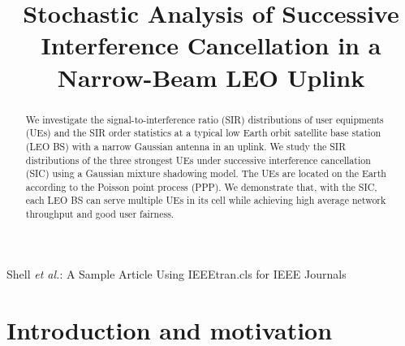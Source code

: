 \documentclass[lettersize,journal]{IEEEtran}
\begin{document}
\title{Stochastic Analysis of Successive Interference Cancellation in a Narrow-Beam LEO Uplink}
\author{
 }

%
{Shell \MakeLowercase{\textit{et al.}}: A Sample Article Using IEEEtran.cls for IEEE Journals}

\IEEEpubid{}


\maketitle
\begin{abstract}
  We investigate the signal-to-interference ratio (SIR) distributions of user equipments (UEs) and the SIR order statistics at a typical low Earth orbit satellite base station (LEO BS) with a narrow Gaussian antenna in an uplink. We study the SIR distributions of the three strongest UEs under successive interference cancellation (SIC) using a Gaussian mixture shadowing model. The UEs are located on the Earth according to the Poisson point process (PPP). We demonstrate that, with the SIC, each LEO BS can serve multiple UEs in its cell while achieving high average network throughput and good user fairness.
\end{abstract}



\section{Introduction and motivation}
\end{document}
